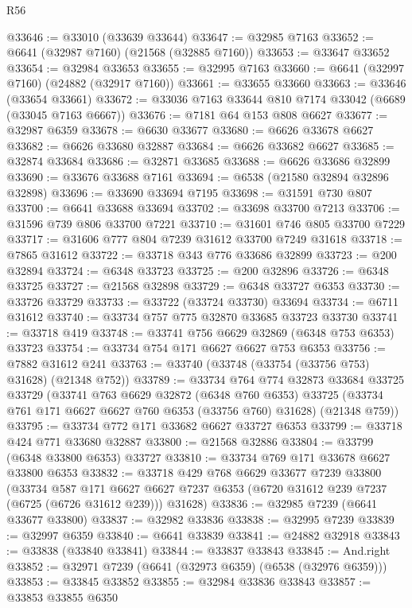 \begin{lexlean}{R56}
\begin{coremodule}
@33646 := @33010 (@33639 @33644)
@33647 := @32985 @7163
@33652 := @6641 (@32987 @7160) (@21568 (@32885 @7160))
@33653 := @33647 @33652
@33654 := @32984 @33653
@33655 := @32995 @7163
@33660 := @6641 (@32997 @7160) (@24882 (@32917 @7160))
@33661 := @33655 @33660
@33663 := @33646 (@33654 @33661)
@33672 := @33036 @7163 @33644 @810 @7174 @33042 (@6689 (@33045 @7163 @6667))
@33676 := @7181 @64 @153 @808 @6627
@33677 := @32987 @6359
@33678 := @6630 @33677
@33680 := @6626 @33678 @6627
@33682 := @6626 @33680 @32887
@33684 := @6626 @33682 @6627
@33685 := @32874 @33684
@33686 := @32871 @33685
@33688 := @6626 @33686 @32899
@33690 := @33676 @33688 @7161
@33694 := @6538 (@21580 @32894 @32896 @32898)
@33696 := @33690 @33694 @7195
@33698 := @31591 @730 @807
@33700 := @6641 @33688 @33694
@33702 := @33698 @33700 @7213
@33706 := @31596 @739 @806 @33700 @7221
@33710 := @31601 @746 @805 @33700 @7229
@33717 := @31606 @777 @804 @7239 @31612 @33700 @7249 @31618
@33718 := @7865 @31612
@33722 := @33718 @343 @776 @33686 @32899
@33723 := @200 @32894
@33724 := @6348 @33723
@33725 := @200 @32896
@33726 := @6348 @33725
@33727 := @21568 @32898
@33729 := @6348 @33727 @6353
@33730 := @33726 @33729
@33733 := @33722 (@33724 @33730) @33694
@33734 := @6711 @31612
@33740 := @33734 @757 @775 @32870 @33685 @33723 @33730
@33741 := @33718 @419
@33748 := @33741 @756 @6629 @32869 (@6348 @753 @6353) @33723
@33754 := @33734 @754 @171 @6627 @6627 @753 @6353
@33756 := @7882 @31612 @241
@33763 := @33740 (@33748 (@33754 (@33756 @753) @31628) (@21348 @752))
@33789 := @33734
    @764
    @774
    @32873
    @33684
    @33725
    @33729
    (@33741
      @763
      @6629
      @32872
      (@6348 @760 @6353)
      @33725
      (@33734 @761 @171 @6627 @6627 @760 @6353 (@33756 @760) @31628)
      (@21348 @759))
@33795 := @33734 @772 @171 @33682 @6627 @33727 @6353
@33799 := @33718 @424 @771 @33680 @32887
@33800 := @21568 @32886
@33804 := @33799 (@6348 @33800 @6353) @33727
@33810 := @33734 @769 @171 @33678 @6627 @33800 @6353
@33832 := @33718
    @429
    @768
    @6629
    @33677
    @7239
    @33800
    (@33734
      @587
      @171
      @6627
      @6627
      @7237
      @6353
      (@6720 @31612 @239 @7237 (@6725 (@6726 @31612 @239)))
      @31628)
@33836 := @32985 @7239 (@6641 @33677 @33800)
@33837 := @32982 @33836
@33838 := @32995 @7239
@33839 := @32997 @6359
@33840 := @6641 @33839
@33841 := @24882 @32918
@33843 := @33838 (@33840 @33841)
@33844 := @33837 @33843
@33845 := And.right
@33852 := @32971 @7239 (@6641 (@32973 @6359) (@6538 (@32976 @6359)))
@33853 := @33845 @33852
@33855 := @32984 @33836 @33843
@33857 := @33853 @33855 @6350

\end{coremodule}
\end{lexlean}

